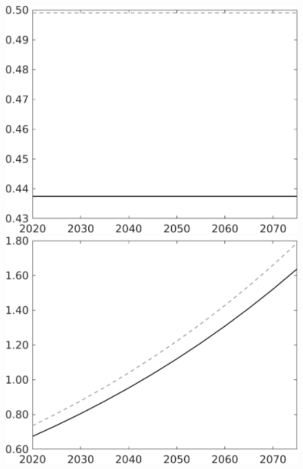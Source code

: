 \documentclass[12pt]{article}
\begin{document}
\begin{figure}[h!!]
\begin{minipage}[]{0.32\textwidth}
	\end{minipage}	
	\begin{minipage}[]{0.32\textwidth}
		\includegraphics[width=1\textwidth]{../../codding_model/own_basedOnFried/optimalPol_010922_revision/figures/all_13Sept22/CompTaul_LFBAU_Reg0_hh_spillover0_nsk0_xgr0_knspil0_sep1_countec0_GovRev0_etaa0.79_lgd0.png}
	\end{minipage}	
	\begin{minipage}[]{0.32\textwidth}
		\includegraphics[width=1\textwidth]{../../codding_model/own_basedOnFried/optimalPol_010922_revision/figures/all_13Sept22/CompTaul_LFBAU_Reg0_C_spillover0_nsk0_xgr0_knspil0_sep1_countec0_GovRev0_etaa0.79_lgd0.png}

\end{minipage}
\end{figure}
\end{document}
